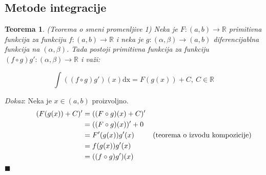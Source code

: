 \documentclass{article}
\newtheorem{teorema}{Teorema}[section]
\begin{document}
\subsection{Metode integracije}
\begin{teoremabox}
    \begin{teorema} \label{teorema_1.2}
        (Teorema o smeni promenljive 1) Neka je $F: (a, b) \longrightarrow \mathbb{R}$ primitivna funkcija za funkciju $f:(a, b) \longrightarrow \mathbb{R}$ i neka je $g: (\alpha, \beta) \longrightarrow (a, b)$ diferencijablna funkcija na $(\alpha, \beta)$. Tada postoji primitivna funkcija za funkciju $(f\circ g) g' : (\alpha, \beta) \longrightarrow \mathbb{R}$ i važi:\par
        \begin{equation*}
            \int ((f\circ g) g')(x)\text{dx} = F(g(x)) + C,\ C\in\mathbb{R}
        \end{equation*}
    \end{teorema}
\end{teoremabox}
\textit{Dokaz}: Neka je $x \in (a, b)$ proizvoljno.
\begin{align*}
    \hspace*{1cm}    (F(g(x)) + C)' & = ((F \circ g)(x) + C)'                                         \\
                                    & = ((F \circ g)(x))' + 0                                         \\
                                    & = F'(g(x))  g'(x)       & \text{(teorema o izvodu kompozicije)} \\
                                    & = f(g(x))  g'(x)                                                \\
                                    & = ((f \circ g)  g')(x)
\end{align*}
\null\hfill $\blacksquare$\par
\end{document}

